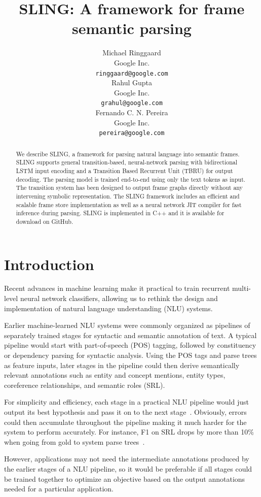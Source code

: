 \documentclass[11pt,a4paper]{article}
\title{SLING: A framework for frame semantic parsing}
\author{
Michael Ringgaard \\ Google Inc. \\ {\tt ringgaard@google.com} \\\And
Rahul Gupta \\ Google Inc. \\ {\tt grahul@google.com} \\\And
Fernando C. N. Pereira \\ Google Inc. \\ {\tt pereira@google.com} \\
}
\begin{document}
\maketitle

\begin{abstract}
We describe SLING, a framework for parsing natural language into
semantic frames. SLING supports general transition-based, neural-network parsing
with bidirectional LSTM input encoding and a Transition Based Recurrent
Unit (TBRU) for output decoding. The parsing model is
trained end-to-end using only the text tokens as input. The
transition system has been designed to output frame graphs directly without
any intervening symbolic representation.
The SLING framework includes an efficient and scalable frame store
implementation as well as a neural network JIT compiler for fast inference
during parsing.
SLING is implemented in C++ and it is available for download on GitHub.
\end{abstract}

\section{Introduction}

Recent advances in machine learning make it practical to train
recurrent multi-level neural network classifiers, allowing us to rethink the
design and implementation of natural language
understanding (NLU) systems.

Earlier machine-learned NLU systems were commonly organized as pipelines of
separately trained stages for syntactic and semantic annotation of text.
A typical  pipeline would start with part-of-speech (POS) tagging, followed by
constituency or dependency parsing for syntactic analysis.
Using the POS tags and parse trees as feature inputs, later stages in the
pipeline could then derive semantically relevant annotations such as entity and
concept mentions, entity types, coreference relationships, and semantic roles
(SRL).

For simplicity and efficiency, each stage in a practical NLU pipeline would just
output its best hypothesis and pass it on to the next stage~\cite{finkel2006}.
Obviously, errors could then accumulate
throughout the pipeline making it much harder for the system to perform
accurately. For instance, F1 on SRL drops by more than 10\% when going from gold
to system parse trees~\cite{toutanova2005}.

However, applications may not need the intermediate annotations produced
by the earlier stages of a NLU pipeline, so it would be preferable if all stages
could be trained together to optimize an objective based on the output
annotations needed for a particular application.
\end{document}
